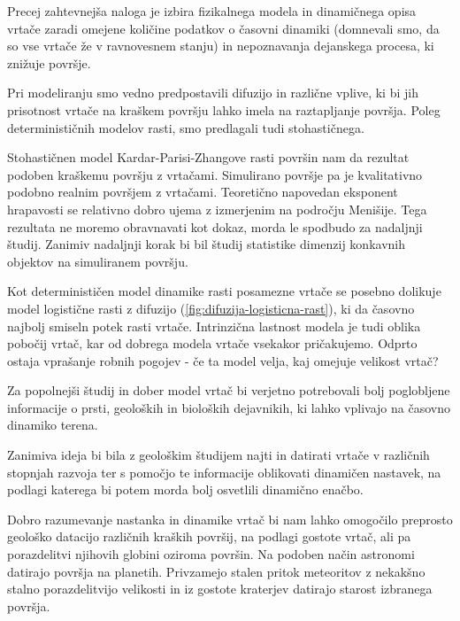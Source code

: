 \documentclass[a4paper, twoside, 12pt]{book}
\begin{document}
    Precej zahtevnejša naloga je izbira fizikalnega modela in dinamičnega opisa vrtače zaradi omejene količine podatkov o časovni dinamiki (domnevali smo, da so vse vrtače že v ravnovesnem stanju) in nepoznavanja dejanskega procesa, ki znižuje površje.

    Pri modeliranju smo vedno predpostavili difuzijo in različne vplive, ki bi jih prisotnost vrtače na kraškem površju lahko imela na raztapljanje površja. Poleg determinističnih modelov rasti, smo predlagali tudi stohastičnega.

    Stohastičnen model Kardar-Parisi-Zhangove rasti površin nam da rezultat podoben kraškemu površju z vrtačami. Simulirano površje pa je kvalitativno podobno realnim površjem z vrtačami. Teoretično napovedan eksponent hrapavosti se relativno dobro ujema z izmerjenim na področju Menišije. Tega rezultata ne moremo obravnavati kot dokaz, morda le spodbudo za nadaljnji študij. Zanimiv nadaljnji korak bi bil študij statistike dimenzij konkavnih objektov na simuliranem površju.

    Kot determinističen model dinamike rasti posamezne vrtače se posebno dolikuje model logistične rasti z difuzijo (\ref{fig:difuzija-logisticna-rast}), ki da časovno najbolj smiseln potek rasti vrtače. Intrinzična lastnost modela je tudi oblika pobočij vrtač, kar od dobrega modela vrtače vsekakor pričakujemo. Odprto ostaja vprašanje robnih pogojev - če ta model velja, kaj omejuje velikost vrtač?

    Za popolnejši študij in dober model vrtač bi verjetno potrebovali bolj poglobljene informacije o prsti, geoloških in bioloških dejavnikih, ki lahko vplivajo na časovno dinamiko terena.

Zanimiva ideja bi bila z geološkim študijem najti in datirati vrtače v različnih stopnjah razvoja ter s pomočjo te informacije oblikovati dinamičen nastavek, na podlagi katerega bi potem morda bolj osvetlili dinamično enačbo.

Dobro razumevanje nastanka in dinamike vrtač bi nam lahko omogočilo preprosto geološko datacijo različnih kraških površij, na podlagi gostote vrtač, ali pa porazdelitvi njihovih globini oziroma površin. Na podoben način astronomi datirajo površja na planetih. Privzamejo stalen pritok meteoritov z nekakšno stalno porazdelitvijo velikosti in iz gostote kraterjev datirajo starost izbranega površja. \cite{trey2011size}

    \newpage \thispagestyle{empty}


    \nocite{*}
    \newpage
    {}
    
\end{document}
